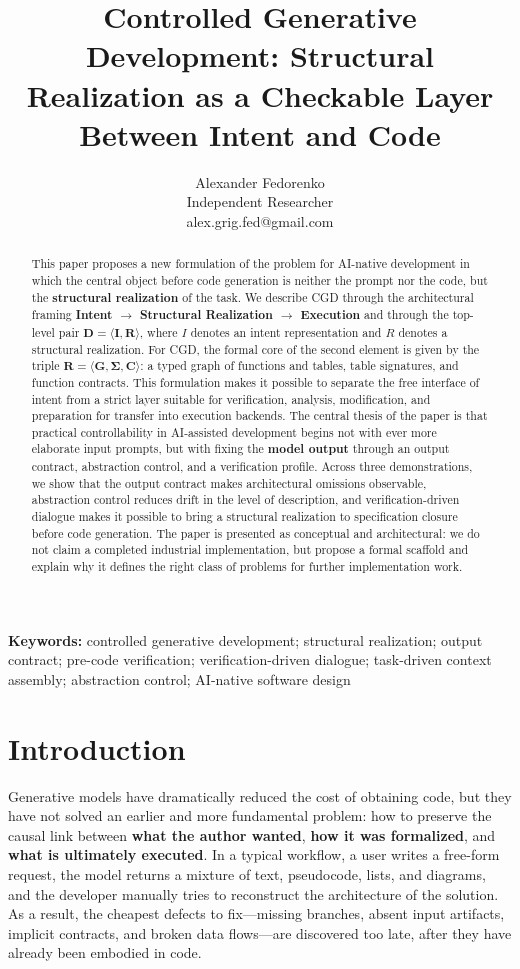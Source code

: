 \documentclass[12pt,a4paper]{article}
\title{Controlled Generative Development: Structural Realization as a Checkable Layer Between Intent and Code}
\author{Alexander Fedorenko \\ Independent Researcher \\ alex.grig.fed@gmail.com}
\date{}
\begin{document}
\maketitle

\begin{abstract}
This paper proposes a new formulation of the problem for AI-native development in which the central object before code generation is neither the prompt nor the code, but the \textbf{structural realization} of the task. We describe CGD through the architectural framing \textbf{Intent $\to$ Structural Realization $\to$ Execution} and through the top-level pair $\mathbf{D = \langle I, R \rangle}$, where $I$ denotes an intent representation and $R$ denotes a structural realization. For CGD, the formal core of the second element is given by the triple $\mathbf{R = \langle G, \Sigma, C \rangle}$: a typed graph of functions and tables, table signatures, and function contracts. This formulation makes it possible to separate the free interface of intent from a strict layer suitable for verification, analysis, modification, and preparation for transfer into execution backends. The central thesis of the paper is that practical controllability in AI-assisted development begins not with ever more elaborate input prompts, but with fixing the \textbf{model output} through an output contract, abstraction control, and a verification profile. Across three demonstrations, we show that the output contract makes architectural omissions observable, abstraction control reduces drift in the level of description, and verification-driven dialogue makes it possible to bring a structural realization to specification closure before code generation. The paper is presented as conceptual and architectural: we do not claim a completed industrial implementation, but propose a formal scaffold and explain why it defines the right class of problems for further implementation work.
\end{abstract}

\noindent\textbf{Keywords:} controlled generative development; structural realization; output contract; pre-code verification; verification-driven dialogue; task-driven context assembly; abstraction control; AI-native software design

\section{Introduction}

Generative models have dramatically reduced the cost of obtaining code, but they have not solved an earlier and more fundamental problem: how to preserve the causal link between \textbf{what the author wanted}, \textbf{how it was formalized}, and \textbf{what is ultimately executed}. In a typical workflow, a user writes a free-form request, the model returns a mixture of text, pseudocode, lists, and diagrams, and the developer manually tries to reconstruct the architecture of the solution. As a result, the cheapest defects to fix---missing branches, absent input artifacts, implicit contracts, and broken data flows---are discovered too late, after they have already been embodied in code.
\end{document}
